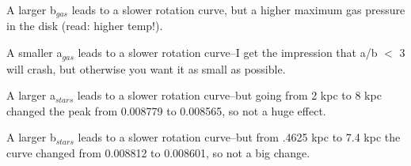 \documentclass[12pt,preprint]{aastex}
\begin{document}
A larger b$_{gas}$ leads to a slower rotation curve, but a higher maximum gas pressure in the disk (read:  higher temp!).  

A smaller a$_{gas}$ leads to a slower rotation curve--I get the impression that a/b $<$ 3 will crash, but otherwise you want it as small as possible.  

A larger a$_{stars}$ leads to a slower rotation curve--but going from 2 kpc to 8 kpc changed the peak from 0.008779 to 0.008565, so not a huge effect.  

A larger b$_{stars}$ leads to a slower rotation curve--but from .4625 kpc to 7.4 kpc the curve changed from 0.008812 to 0.008601, so not a big change.  
\end{document}
